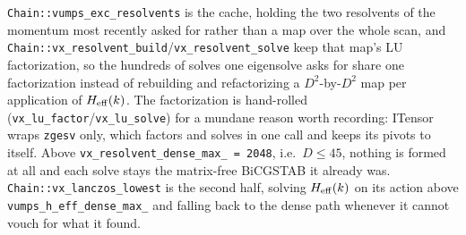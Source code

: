 \documentclass[11pt]{article}
\begin{document}
\texttt{Chain::vumps\_exc\_resolvents} is the cache, holding the two
resolvents of the momentum most recently asked for rather than a map
over the whole scan, and
\texttt{Chain::vx\_resolvent\_build}/\texttt{vx\_resolvent\_solve} keep
that map's LU factorization, so the hundreds of solves one eigensolve
asks for share one factorization instead of rebuilding and refactorizing
a $D^2$-by-$D^2$ map per application of $H_{\rm eff}(k)$. The
factorization is hand-rolled
(\texttt{vx\_lu\_factor}/\texttt{vx\_lu\_solve}) for a mundane reason
worth recording: ITensor wraps \texttt{zgesv} only, which factors and
solves in one call and keeps its pivots to itself. Above
\texttt{vx\_resolvent\_dense\_max\_ = 2048}, i.e.\ $D \le 45$, nothing is
formed at all and each solve stays the matrix-free BiCGSTAB it already
was. \texttt{Chain::vx\_lanczos\_lowest} is the second half, solving
$H_{\rm eff}(k)$ on its action above
\texttt{vumps\_h\_eff\_dense\_max\_} and falling back to the dense path
whenever it cannot vouch for what it found.
\end{document}
